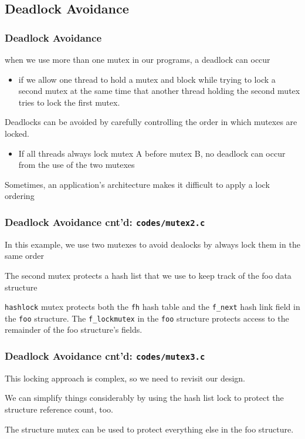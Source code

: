\documentclass[newPxFont,sthlmFooter,nooffset]{beamer}
\begin{document}
\subsection{Deadlock Avoidance}
\begin{frame}[t]
  \frametitle{Deadlock Avoidance}
when we use more than one mutex in our programs, a deadlock can occur
\begin{itemize}
\item  if we allow one thread to hold a mutex and
  block while trying to lock a second mutex at the same time that
  another thread holding the second mutex tries to lock the first
  mutex.
\end{itemize}
Deadlocks can be avoided by carefully controlling the order in which mutexes are locked.
\begin{itemize}
\item If all threads always lock mutex A before mutex B, no deadlock can occur from the use of the two mutexes
\end{itemize}

Sometimes, an application’s architecture makes it difficult to apply a lock ordering
\end{frame}


\begin{frame}
  \frametitle{Deadlock Avoidance cnt'd: \texttt{codes/mutex2.c}}
In this example, we use two mutexes to avoid dealocks by always lock them in the same order

The second mutex protects a hash list that we use to keep track of the foo data structure

\texttt{hashlock} mutex protects both the \texttt{fh} hash table and the \texttt{f\_next} hash link field in the \texttt{foo} structure. The \texttt{f\_lockmutex} in the \texttt{foo} structure protects access to the remainder of the foo structure’s fields.




\end{frame}

\begin{frame}
  \frametitle{Deadlock Avoidance cnt'd: \texttt{codes/mutex3.c}}
This locking approach is complex, so we need to revisit our design.

We can simplify things considerably by using the hash list lock to protect the structure reference count, too.

The structure mutex can be used to protect everything else in the foo structure.


\end{frame}
\end{document}

